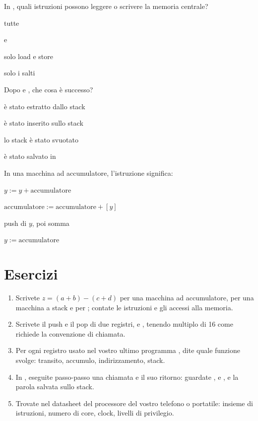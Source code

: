 \begin{quiz}{In \riscv, quali istruzioni possono leggere o scrivere la memoria centrale?}
\item tutte
\item {} e 
\item solo load e store
\item solo i salti
\end{quiz}

\begin{quiz}{Dopo  e , che cosa è successo?}
\item {} è stato estratto dallo stack
\item {} è stato inserito sullo stack
\item lo stack è stato svuotato
\item {} è stato salvato in 
\end{quiz}

\begin{quiz}{In una macchina ad accumulatore, l'istruzione  significa:}
\item $y := y + \text{accumulatore}$
\item $\text{accumulatore} := \text{accumulatore} + [y]$
\item push di $y$, poi somma
\item $y := \text{accumulatore}$
\end{quiz}

\section{Esercizi}

\begin{exercise}
\begin{enumerate}[nosep]
\item Scrivete $z=(a+b)-(c+d)$ per una macchina ad accumulatore, per una
  macchina a stack e per \riscv; contate le istruzioni e gli accessi alla
  memoria.
\item Scrivete il push e il pop di due registri,  e , tenendo
   multiplo di 16 come richiede la convenzione di chiamata.
\item Per ogni registro usato nel vostro ultimo programma \prg, dite quale
  funzione svolge: transito, accumulo, indirizzamento, stack.
\item In \prgqt, eseguite passo-passo una chiamata e il suo ritorno: guardate
  ,  e , e la parola salvata sullo stack.
\item Trovate nel datasheet del processore del vostro telefono o portatile:
  insieme di istruzioni, numero di core, clock, livelli di privilegio.
\end{enumerate}
\end{exercise}


